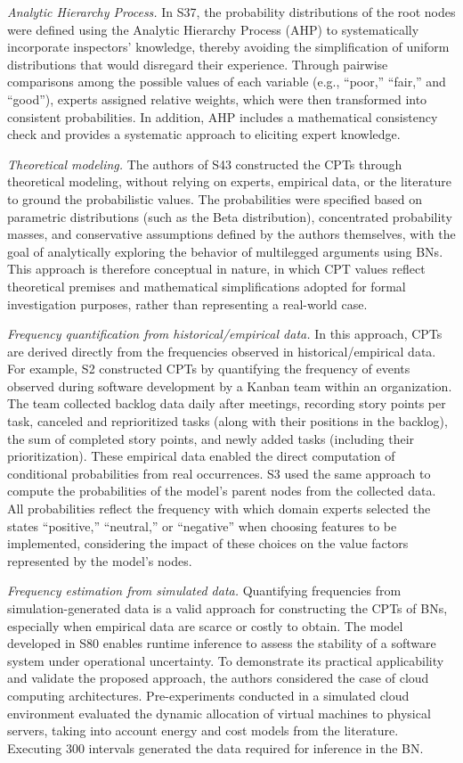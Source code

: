 \textit{Analytic Hierarchy Process.} In S37, the probability distributions of the root nodes were defined using the Analytic Hierarchy Process (AHP) to systematically incorporate inspectors' knowledge, thereby avoiding the simplification of uniform distributions that would disregard their experience. Through pairwise comparisons among the possible values of each variable (e.g., ``poor,'' ``fair,'' and ``good''), experts assigned relative weights, which were then transformed into consistent probabilities. In addition, AHP includes a mathematical consistency check and provides a systematic approach to eliciting expert knowledge.

\textit{Theoretical modeling.} The authors of S43 constructed the CPTs through theoretical modeling, without relying on experts, empirical data, or the literature to ground the probabilistic values. The probabilities were specified based on parametric distributions (such as the Beta distribution), concentrated probability masses, and conservative assumptions defined by the authors themselves, with the goal of analytically exploring the behavior of multilegged arguments using BNs. This approach is therefore conceptual in nature, in which CPT values reflect theoretical premises and mathematical simplifications adopted for formal investigation purposes, rather than representing a real-world case.

\textit{Frequency quantification from historical/empirical data.} In this approach, CPTs are derived directly from the frequencies observed in historical/empirical data. For example, S2 constructed CPTs by quantifying the frequency of events observed during software development by a Kanban team within an organization. The team collected backlog data daily after meetings, recording story points per task, canceled and reprioritized tasks (along with their positions in the backlog), the sum of completed story points, and newly added tasks (including their prioritization). These empirical data enabled the direct computation of conditional probabilities from real occurrences. S3 used the same approach to compute the probabilities of the model's parent nodes from the collected data. All probabilities reflect the frequency with which domain experts selected the states ``positive,'' ``neutral,'' or ``negative'' when choosing features to be implemented, considering the impact of these choices on the value factors represented by the model's nodes.

\textit{Frequency estimation from simulated data.} Quantifying frequencies from simulation-generated data is a valid approach for constructing the CPTs of BNs, especially when empirical data are scarce or costly to obtain. The model developed in S80 enables runtime inference to assess the stability of a software system under operational uncertainty. To demonstrate its practical applicability and validate the proposed approach, the authors considered the case of cloud computing architectures. Pre-experiments conducted in a simulated cloud environment evaluated the dynamic allocation of virtual machines to physical servers, taking into account energy and cost models from the literature. Executing 300 intervals generated the data required for inference in the BN.

